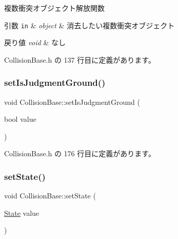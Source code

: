 複数衝突オブジェクト解放関数 


\begin{DoxyParams}[1]{引数}
\mbox{\tt in}  & {\em object} & 消去したい複数衝突オブジェクト \\
\hline
\end{DoxyParams}

\begin{DoxyRetVals}{戻り値}
{\em void} & なし \\
\hline
\end{DoxyRetVals}


 Collision\+Base.\+h の 137 行目に定義があります。

\mbox{\label{class_collision_base_a231cb5c715701444db63db030c06b694}} 
\subsubsection{\texorpdfstring{set\+Is\+Judgment\+Ground()}{setIsJudgmentGround()}}
{\footnotesize\ttfamily void Collision\+Base\+::set\+Is\+Judgment\+Ground (\begin{DoxyParamCaption}\item[{bool}]{value }\end{DoxyParamCaption})\hspace{0.3cm}{\ttfamily [inline]}}



 Collision\+Base.\+h の 176 行目に定義があります。

\mbox{\label{class_collision_base_a01db1e666b8e71c33969e9ab6bbc724e}} 
\subsubsection{\texorpdfstring{set\+State()}{setState()}}
{\footnotesize\ttfamily void Collision\+Base\+::set\+State (\begin{DoxyParamCaption}\item[{\mbox{\hyperlink{class_collision_base_a4dd1ed00099a19c0176913af93c4e365}{State}}}]{value }\end{DoxyParamCaption})\hspace{0.3cm}{\ttfamily [inline]}}



